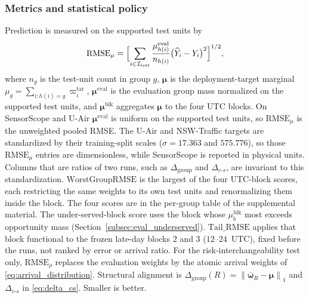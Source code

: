 \documentclass[letterpaper,journal]{IEEEtran}
\begin{document}
\subsubsection{Metrics and statistical policy}

Prediction is measured on the supported test units by
\[
 \mathrm{RMSE}_{\mu}
 =
 \Bigl[\sum_{i\in\mathcal{I}_{\mathrm{test}}}
 \frac{\mu^{\mathrm{eval}}_{h(i)}}{n_{h(i)}}
 \bigl(\widehat Y_i-Y_i\bigr)^2\Bigr]^{1/2},
\]
where $n_g$ is the test-unit count in group $g$, $\boldsymbol\mu$ is the
deployment-target marginal $\mu_g=\sum_{i:h(i)=g}\varpi_i^{\mathrm{tar}}$,
$\boldsymbol\mu^{\mathrm{eval}}$ is the evaluation group mass normalized on
the supported test units, and $\boldsymbol\mu^{\mathrm{blk}}$ aggregates
$\boldsymbol\mu$ to the four UTC blocks.  On SensorScope and U-Air
$\boldsymbol\mu^{\mathrm{eval}}$ is uniform on the supported test units, so
$\mathrm{RMSE}_{\mu}$ is the unweighted pooled RMSE.
The U-Air and NSW-Traffic targets are standardized by their training-split
scales ($\sigma=17.363$ and $575.776$), so those $\mathrm{RMSE}_{\mu}$ entries
are dimensionless, while SensorScope is reported in physical units.  Columns
that are ratios of two runs, such as $\Delta_{\mathrm{group}}$ and
$\Delta_{c\text{-}s}$, are invariant to this standardization.
$\mathrm{WorstGroupRMSE}$ is the largest of the four UTC-block scores, each
restricting the same weights to its own test units and renormalizing them
inside the block.  The four scores are in the per-group table of the
supplemental material.  The under-served-block score uses the block whose
$\mu^{\mathrm{blk}}_b$ most exceeds opportunity mass
(Section~\ref{subsec:eval_underserved}).
$\mathrm{Tail\_RMSE}$ applies that block functional to the frozen late-day
blocks $2$ and $3$ ($12$--$24$~UTC), fixed before the runs, not ranked by
error or arrival ratio.
For the risk-interchangeability test only, $\mathrm{RMSE}_{\rho}$ replaces the
evaluation weights by the atomic arrival weights of
\eqref{eq:arrival_distribution}.  Structural
alignment is $\Delta_{\mathrm{group}}(R)=\left\|\overline{\boldsymbol\omega}_R-\boldsymbol\mu\right\|_1$
and $\Delta_{c\text{-}s}$ in \eqref{eq:delta_cs}.  Smaller is better.
\end{document}
